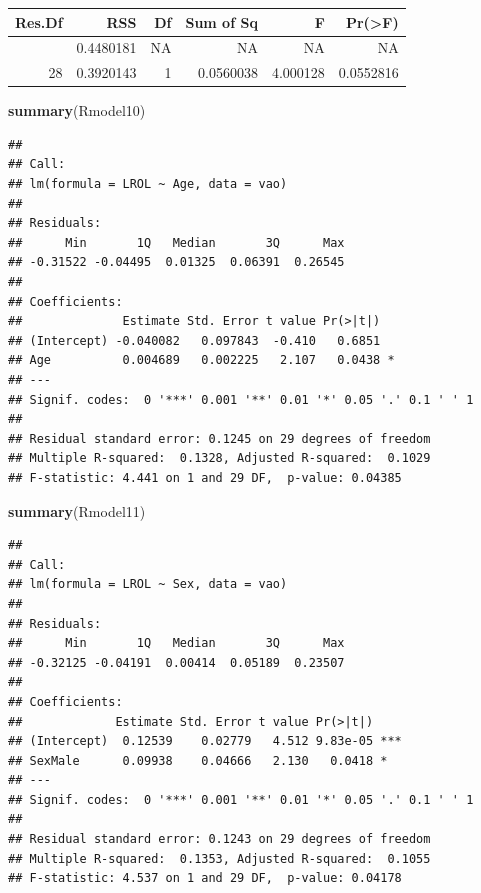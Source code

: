 \documentclass[
]{article}
\newenvironment{Shaded}{\begin{snugshade}}{\end{snugshade}}
\newcommand{\FunctionTok}[1]{\textcolor[rgb]{0.13,0.29,0.53}{\textbf{#1}}}
\newcommand{\NormalTok}[1]{#1}
\begin{document}
\begin{longtable}[]{@{}rrrrrr@{}}
\toprule\noalign{}
Res.Df & RSS & Df & Sum of Sq & F & Pr(\textgreater F) \\
\midrule\noalign{}
\endhead
\bottomrule\noalign{}
\endlastfoot
29 & 0.4480181 & NA & NA & NA & NA \\
28 & 0.3920143 & 1 & 0.0560038 & 4.000128 & 0.0552816 \\
\end{longtable}

\begin{Shaded}
\begin{Highlighting}[]
\FunctionTok{summary}\NormalTok{(Rmodel10)}
\end{Highlighting}
\end{Shaded}

\begin{verbatim}
## 
## Call:
## lm(formula = LROL ~ Age, data = vao)
## 
## Residuals:
##      Min       1Q   Median       3Q      Max 
## -0.31522 -0.04495  0.01325  0.06391  0.26545 
## 
## Coefficients:
##              Estimate Std. Error t value Pr(>|t|)  
## (Intercept) -0.040082   0.097843  -0.410   0.6851  
## Age          0.004689   0.002225   2.107   0.0438 *
## ---
## Signif. codes:  0 '***' 0.001 '**' 0.01 '*' 0.05 '.' 0.1 ' ' 1
## 
## Residual standard error: 0.1245 on 29 degrees of freedom
## Multiple R-squared:  0.1328, Adjusted R-squared:  0.1029 
## F-statistic: 4.441 on 1 and 29 DF,  p-value: 0.04385
\end{verbatim}

\begin{Shaded}
\begin{Highlighting}[]
\FunctionTok{summary}\NormalTok{(Rmodel11)}
\end{Highlighting}
\end{Shaded}

\begin{verbatim}
## 
## Call:
## lm(formula = LROL ~ Sex, data = vao)
## 
## Residuals:
##      Min       1Q   Median       3Q      Max 
## -0.32125 -0.04191  0.00414  0.05189  0.23507 
## 
## Coefficients:
##             Estimate Std. Error t value Pr(>|t|)    
## (Intercept)  0.12539    0.02779   4.512 9.83e-05 ***
## SexMale      0.09938    0.04666   2.130   0.0418 *  
## ---
## Signif. codes:  0 '***' 0.001 '**' 0.01 '*' 0.05 '.' 0.1 ' ' 1
## 
## Residual standard error: 0.1243 on 29 degrees of freedom
## Multiple R-squared:  0.1353, Adjusted R-squared:  0.1055 
## F-statistic: 4.537 on 1 and 29 DF,  p-value: 0.04178
\end{verbatim}
\end{document}

